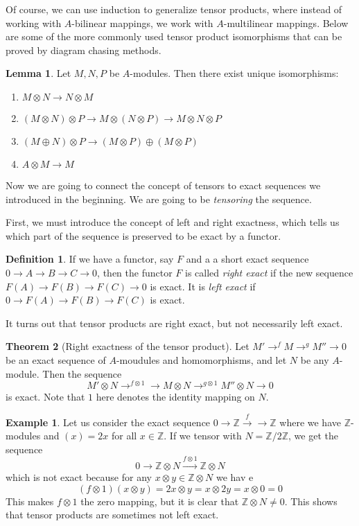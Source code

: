 \documentclass[11pt]{article}
\theoremstyle{definition}
\newtheorem{definition}{Definition}[section]
\newtheorem{example}{Example}[section]
\newtheorem{theorem}{Theorem}[section]
\newtheorem{lemma}[theorem]{Lemma}
\newcommand{\Z}{\mathbb{Z}}
\begin{document}
 Of course, we can use induction to generalize tensor products, where instead of working with $A$-bilinear mappings, we work with $A$-multilinear mappings. Below are some of the more commonly used tensor product isomorphisms that can be proved by diagram chasing methods. 
 
 \begin{lemma}
 Let $M,N,P$ be $A$-modules. Then there exist unique isomorphisms:
 \begin{enumerate}
     \item $M\otimes N\rightarrow N\otimes M$
     \item $(M\otimes N)\otimes P\rightarrow M\otimes(N\otimes P)\rightarrow M\otimes N\otimes P$
     \item $(M\oplus N)\otimes P\rightarrow (M\otimes P)\oplus(M\otimes P)$
     \item $A\otimes M\rightarrow M$
 \end{enumerate}
 \end{lemma}
Now we are going to connect the concept of tensors to exact sequences we introduced in the beginning. We are going to be \textit{tensoring} the sequence. 

First, we must introduce the concept of left and right exactness, which tells us which part of the sequence is preserved to be exact by a functor. 
\begin{definition}
If we have a functor, say $F$ and a a short exact sequence $0\rightarrow A\rightarrow B\rightarrow C\rightarrow 0$, then the functor $F$ is called \textit{right exact} if the new sequence $F(A)\rightarrow F(B)\rightarrow F(C)\rightarrow 0$ is exact. It is \textit{left exact} if $0\rightarrow F(A)\rightarrow F(B)\rightarrow F(C)$ is exact.
\end{definition}

It turns out that tensor products are right exact, but not necessarily left exact. 
\begin{theorem}[Right exactness of the tensor product]
Let $M'\rightarrow^{f}M\rightarrow^{g} M''\rightarrow 0$ be an exact sequence of $A$-moudules and homomorphisms, and let $N$ be any $A$-module. Then the sequence
$$M'\otimes N\rightarrow^{f\otimes 1}\rightarrow M\otimes N\rightarrow^{g\otimes 1}M''\otimes N\rightarrow 0 $$
is exact. Note that $1$ here denotes the identity mapping on $N$. 
\end{theorem}

\begin{example}
Let us consider the exact sequence $0\rightarrow \Z\xrightarrow{f}\rightarrow \Z$ where we have $\Z$-modules and $(x)=2x$ for all $x\in \Z$. If we tensor with $N=\Z/2\Z$, we get the sequence 
$$0\rightarrow \Z\otimes N\xrightarrow{f\otimes 1}\Z\otimes N $$
which is not exact because for any $x\otimes y\in \Z\otimes N$ we hav e
$$(f\otimes 1)(x\otimes y)=2x\otimes y=x\otimes 2y=x\otimes 0=0 $$
This makes $f\otimes 1$ the zero mapping, but it is clear that $\Z\otimes N\neq 0$. This shows that tensor products are sometimes not left exact. 
\end{example}
\end{document}
